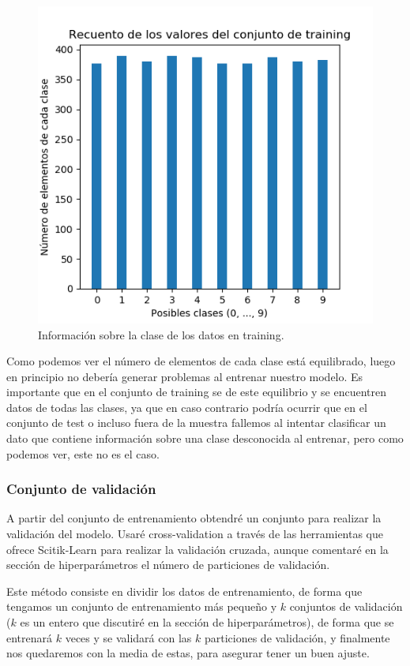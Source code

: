 \documentclass[12pt, spanish]{article}
\begin{document}
\begin{figure}[H]
	\centering
	\includegraphics[scale=1]{clasificacion/datos_tra.png}
	\caption{Información sobre la clase de los datos en training.}
	\label{claseDatosClasificacion}
\end{figure}

Como podemos ver el número de elementos de cada clase está equilibrado, luego en principio no debería generar problemas al entrenar nuestro modelo. Es importante que en el conjunto de training se de este equilibrio y se encuentren datos de todas las clases, ya que en caso contrario podría ocurrir que en el conjunto de test o incluso fuera de la muestra fallemos al intentar clasificar un dato que contiene información sobre una clase desconocida al entrenar, pero como podemos ver, este no es el caso.

\subsubsection{Conjunto de validación}

A partir del conjunto de entrenamiento obtendré un conjunto para realizar la validación del modelo. Usaré cross-validation a través de las herramientas que ofrece Scitik-Learn para realizar la validación cruzada\cite{crossval}, aunque comentaré en la sección de hiperparámetros el número de particiones de validación. 

Este método consiste en dividir los datos de entrenamiento, de forma que tengamos un conjunto de entrenamiento más pequeño y $k$ conjuntos de validación ($k$ es un entero que discutiré en la sección de hiperparámetros), de forma que se entrenará $k$  veces y se validará con las $k$ particiones de validación, y finalmente nos quedaremos con la media de estas, para asegurar tener un buen ajuste.
\end{document}
